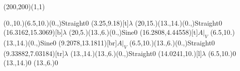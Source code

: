 \unitlength=1bp%

\begin{feynartspicture}(200,200)(1,1)

\FADiagram{}
\FAProp(0.,10.)(6.5,10.)(0.,){Straight}{0}
\FALabel(3.25,9.18)[t]{$\lambda$}
\FAProp(20,15.)(13.,14.)(0.,){Straight}{0}
\FALabel(16.3162,15.3069)[b]{$\lambda$}
\FAProp(20,5.)(13.,6.)(0.,){Sine}{0}
\FALabel(16.2808,4.44558)[t]{$A|_V$}
\FAProp(6.5,10.)(13.,14.)(0.,){Sine}{0}
\FALabel(9.2078,13.1811)[br]{$A|_V$}
\FAProp(6.5,10.)(13.,6.)(0.,){Straight}{0}
\FALabel(9.33882,7.03184)[tr]{$\lambda$}
\FAProp(13.,14.)(13.,6.)(0.,){Straight}{0}
\FALabel(14.0241,10.)[l]{$\lambda$}
\FAVert(6.5,10.){0}
\FAVert(13.,14.){0}
\FAVert(13.,6.){0}
\end{feynartspicture}

